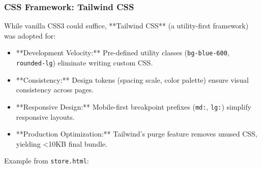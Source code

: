 \documentclass[12pt, a4paper]{report}
\begin{document}
\subsubsection{CSS Framework: Tailwind CSS}

While vanilla CSS3 could suffice, **Tailwind CSS** (a utility-first framework) was adopted for:

\begin{itemize}
    \item **Development Velocity:** Pre-defined utility classes (\texttt{bg-blue-600}, \texttt{rounded-lg}) eliminate writing custom CSS.
    \item **Consistency:** Design tokens (spacing scale, color palette) ensure visual consistency across pages.
    \item **Responsive Design:** Mobile-first breakpoint prefixes (\texttt{md:}, \texttt{lg:}) simplify responsive layouts.
    \item **Production Optimization:** Tailwind's purge feature removes unused CSS, yielding \textless10KB final bundle.
\end{itemize}

Example from \texttt{store.html}:
\end{document}
